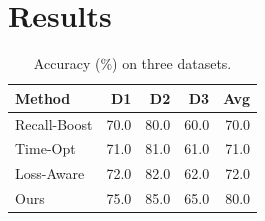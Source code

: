 \documentclass{article}\usepackage{booktabs}
\begin{document}
\section{Results}
\begin{table}[h]\centering\caption{Accuracy (\%) on three datasets.}\label{tab:a}
\begin{tabular}{lrrrr}
\toprule
Method & D1 & D2 & D3 & Avg \\
\midrule
Recall-Boost & 70.0 & 80.0 & 60.0 & 70.0 \\
Time-Opt & 71.0 & 81.0 & 61.0 & 71.0 \\
Loss-Aware & 72.0 & 82.0 & 62.0 & 72.0 \\
Ours & 75.0 & 85.0 & 65.0 & 80.0 \\
\bottomrule
\end{tabular}\end{table}
\end{document}

